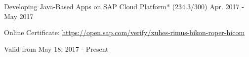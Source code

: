 \begin{cventries}
  \cventry
    {Developing Java-Based Apps on SAP Cloud Platform* (234.3/300)} %
    {} %
    {} %
    {Apr. 2017 - May 2017} %
    {
	    \begin{cvitems} %
        \item[] {Online Certificate: \url{https://open.sap.com/verify/xuhes-rimus-bikon-roper-hicom}} %
        \item[] {Valid from May 18, 2017 - Present} %
      \end{cvitems}
    }    
    \vspace{-0.1cm}

\end{cventries}
